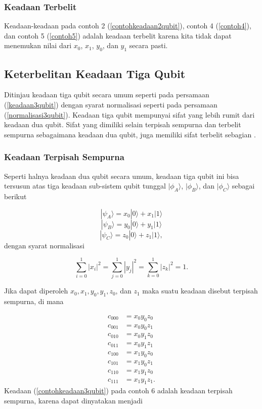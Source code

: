 \subsubsection{Keadaan Terbelit}
Keadaan-keadaan pada contoh 2 (\ref{contohkeadaan2qubit}), contoh 4 (\ref{contoh4}), dan contoh 5 (\ref{contoh5}) adalah keadaan terbelit karena kita tidak dapat menemukan nilai dari $x_0$, $x_1$, $y_0$, dan $y_1$ secara pasti.

\subsection{Keterbelitan Keadaan Tiga Qubit}
Ditinjau keadaan tiga qubit secara umum seperti pada persamaan (\ref{keadaan3qubit}) dengan syarat normalisasi seperti pada persamaan (\ref{normalisasi3qubit}). Keadaan tiga qubit mempunyai sifat yang lebih rumit dari keadaan dua qubit. Sifat yang dimiliki selain terpisah sempurna dan terbelit sempurna sebagaimana keadaan dua qubit, juga memiliki sifat terbelit sebagian \cite{Acin2001,Seevinck2008,Verstraete2002}.

\subsubsection{Keadaan Terpisah Sempurna}
Seperti halnya keadaan dua qubit secara umum, keadaan tiga qubit ini bisa tersusun atas
tiga keadaan sub-sistem qubit tunggal $|\phi_A\rangle$, $|\phi_B\rangle$, dan $|\phi_C\rangle$
sebagai berikut

\begin{equation*}
	|\psi_A\rangle = x_0 |0\rangle + x_1 |1\rangle
\end{equation*}
\begin{equation}
	|\psi_B\rangle = y_0 |0\rangle + y_1 |1\rangle
\end{equation}
\begin{equation*}
	|\psi_C\rangle = z_0 |0\rangle + z_1 |1\rangle ,
\end{equation*}
dengan syarat normalisasi

\begin{equation}
	\sum_{i=0}^{1} |x_i|^2
	=
	\sum_{j=0}^{1} |y_j|^2
	=
	\sum_{k=0}^{1} |z_k|^2
	= 1 .
\end{equation}

Jika dapat diperoleh $x_0, x_1, y_0, y_1, z_0$, dan $z_1$ maka suatu keadaan disebut terpisah sempurna, di mana

\begin{align}
	c_{000} &= x_0 y_0 z_0 \nonumber \\
	c_{001} &= x_0 y_0 z_1 \nonumber \\
	c_{010} &= x_0 y_1 z_0 \nonumber \\
	c_{011} &= x_0 y_1 z_1 \nonumber \\
	c_{100} &= x_1 y_0 z_0 \nonumber \\
	c_{101} &= x_1 y_0 z_1 \nonumber \\
	c_{110} &= x_1 y_1 z_0 \nonumber \\
	c_{111} &= x_1 y_1 z_1 \label{koefisien3qubit}.
\end{align}
Keadaan (\ref{contohkeadaan3qubit}) pada contoh 6 adalah keadaan terpisah sempurna, karena dapat dinyatakan menjadi

